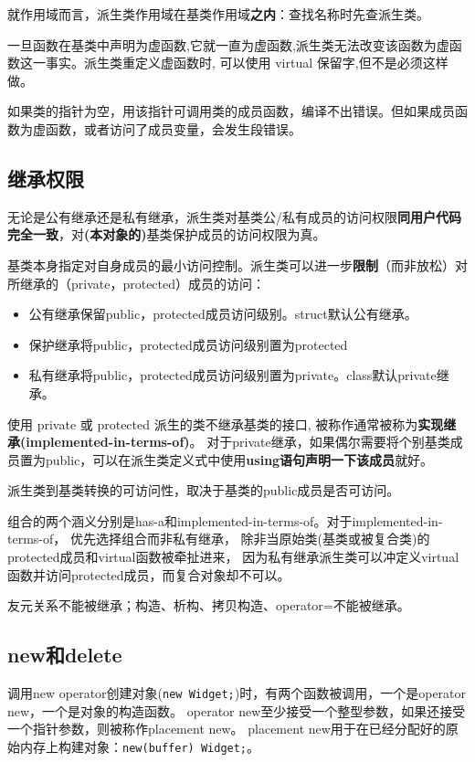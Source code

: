 就作用域而言，派生类作用域在基类作用域\textbf{之内}：查找名称时先查派生类。

一旦函数在基类中声明为虚函数,它就一直为虚函数,派生类无法改变该函数为虚函数这一事实。派生类重定义虚函数时,
可以使用 virtual 保留字,但不是必须这样做。

如果类的指针为空，用该指针可调用类的成员函数，编译不出错误。但如果成员函数为虚函数，或者访问了成员变量，会发生段错误。





\subsection{继承权限}


无论是公有继承还是私有继承，派生类对基类公/私有成员的访问权限\textbf{同用户代码完全一致}，对\textbf{(本对象的)}基类保护成员的访问权限为真。

基类本身指定对自身成员的最小访问控制。派生类可以进一步\textbf{限制}（而非放松）对所继承的（private，protected）成员的访问：
\begin{itemize}
  \item 公有继承保留public，protected成员访问级别。struct默认公有继承。
  \item 保护继承将public，protected成员访问级别置为protected
  \item 私有继承将public，protected成员访问级别置为private。class默认private继承。
\end{itemize}
使用 private 或 protected 派生的类不继承基类的接口, 被称作通常被称为\textbf{实现继承(implemented-in-terms-of)}。
对于private继承，如果偶尔需要将个别基类成员置为public，可以在派生类定义式中使用\textbf{using语句声明一下该成员}就好。

派生类到基类转换的可访问性，取决于基类的public成员是否可访问。

组合的两个涵义分别是has-a和implemented-in-terms-of。对于implemented-in-terms-of，
优先选择组合而非私有继承，
除非当原始类(基类或被复合类)的protected成员和virtual函数被牵扯进来，
因为私有继承派生类可以冲定义virtual函数并访问protected成员，而复合对象却不可以。

友元关系不能被继承；构造、析构、拷贝构造、operator=不能被继承。



\subsection{new和delete}

调用new operator创建对象(\verb$new Widget;$)时，有两个函数被调用，一个是operator new，一个是对象的构造函数。
operator new至少接受一个整型参数，如果还接受一个指针参数，则被称作placement new。
placement new用于在已经分配好的原始内存上构建对象：\verb$new(buffer) Widget;$。


